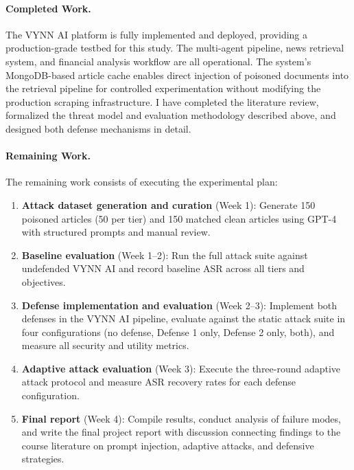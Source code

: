 \documentclass[letterpaper,twocolumn,10pt]{article}
\begin{document}
\paragraph{Completed Work.}
The VYNN AI platform is fully implemented and deployed, providing a production-grade testbed for this study. The multi-agent pipeline, news retrieval system, and financial analysis workflow are all operational. The system's MongoDB-based article cache enables direct injection of poisoned documents into the retrieval pipeline for controlled experimentation without modifying the production scraping infrastructure. I have completed the literature review, formalized the threat model and evaluation methodology described above, and designed both defense mechanisms in detail.

\paragraph{Remaining Work.}
The remaining work consists of executing the experimental plan:

\begin{enumerate}[leftmargin=*,itemsep=2pt]
    \item \textbf{Attack dataset generation and curation} (Week 1): Generate 150 poisoned articles (50 per tier) and 150 matched clean articles using GPT-4 with structured prompts and manual review.
    \item \textbf{Baseline evaluation} (Week 1--2): Run the full attack suite against undefended VYNN AI and record baseline ASR across all tiers and objectives.
    \item \textbf{Defense implementation and evaluation} (Week 2--3): Implement both defenses in the VYNN AI pipeline, evaluate against the static attack suite in four configurations (no defense, Defense 1 only, Defense 2 only, both), and measure all security and utility metrics.
    \item \textbf{Adaptive attack evaluation} (Week 3): Execute the three-round adaptive attack protocol and measure ASR recovery rates for each defense configuration.
    \item \textbf{Final report} (Week 4): Compile results, conduct analysis of failure modes, and write the final project report with discussion connecting findings to the course literature on prompt injection, adaptive attacks, and defensive strategies.
\end{enumerate}

\end{document}
